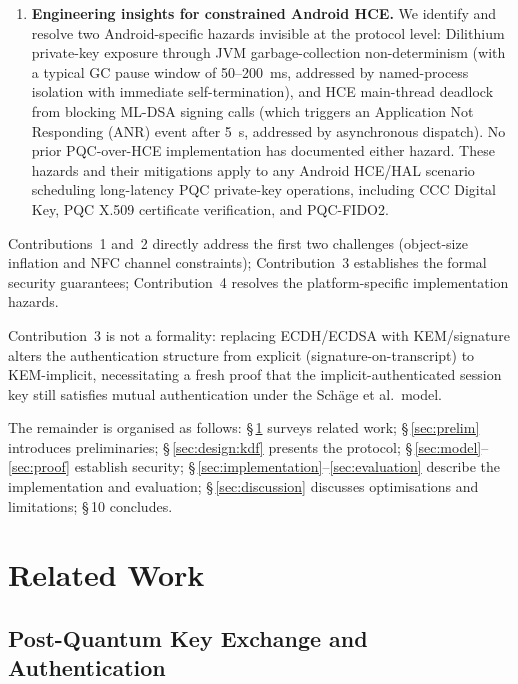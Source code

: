 \documentclass[runningheads]{llncs}
\begin{document}
\begin{enumerate}
\item \textbf{Engineering insights for constrained Android HCE.}
We identify and resolve two Android-specific hazards invisible at the protocol level: Dilithium private-key exposure through JVM garbage-collection non-determinism (with a typical GC pause window of 50--200~ms, addressed by named-process isolation with immediate self-termination), and HCE main-thread deadlock from blocking ML-DSA signing calls (which triggers an Application Not Responding (ANR) event after 5~s, addressed by asynchronous dispatch). No prior PQC-over-HCE implementation has documented either hazard. These hazards and their mitigations apply to any Android HCE/HAL scenario scheduling long-latency PQC private-key operations, including CCC Digital Key, PQC X.509 certificate verification, and PQC-FIDO2.

\end{enumerate}

\noindent
Contributions~1 and~2 directly address the first two challenges (object-size inflation and NFC channel constraints); Contribution~3 establishes the formal security guarantees; Contribution~4 resolves the platform-specific implementation hazards.

\noindent
Contribution~3 is not a formality: replacing ECDH/ECDSA with KEM/signature alters the authentication structure from explicit (signature-on-transcript) to KEM-implicit, necessitating a fresh proof that the implicit-authenticated session key still satisfies mutual authentication under the Sch{\"a}ge et al.~model.

\noindent
The remainder is organised as follows: \S\,\ref{sec:related} surveys related work; \S\,\ref{sec:prelim} introduces preliminaries; \S\,\ref{sec:design:kdf} presents the protocol; \S\,\ref{sec:model}--\ref{sec:proof} establish security; \S\,\ref{sec:implementation}--\ref{sec:evaluation} describe the implementation and evaluation; \S\,\ref{sec:discussion} discusses optimisations and limitations; \S\,10 concludes.
\section{Related Work}
\label{sec:related}

\subsection{Post-Quantum Key Exchange and Authentication}
\label{sec:related:pqake}
\end{document}
